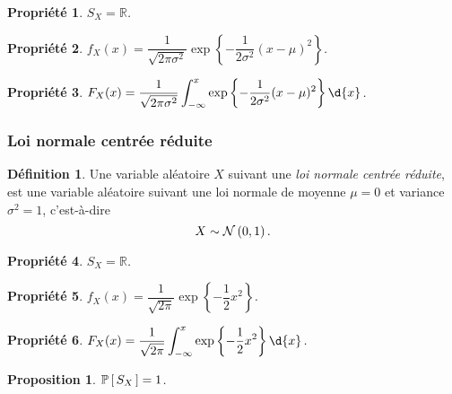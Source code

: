 \documentclass[11pt]{article}
\makeatletter
\renewcommand\P[1]{%
	\ensuremath{%
		\mathbb{P}\left[\,#1\,\right]%
	}%
}%
\newcommand\Norm[2]{%
	\ensuremath{%
		\mathcal{N}\left(#1,#2\right)%
	}%
}%
\newtheorem*{proposition}{Proposition}
\newtheorem{property}{Propriété}
\theoremstyle{remark}
\theoremstyle{definition}
\newtheorem*{@definition}{Définition}
\newenvironment{definition}{%
	\begin{@definition}%
}{%
	\end{@definition}%
	\setcounter{property}{0}%
}
\makeatother
\begin{document}
\begin{property}
	$S_X=\mathbb{R}$.
\end{property}

\begin{property}
	$f_X(x)=\dfrac{1}{\sqrt{2\pi\sigma^2}}\exp\left\{
		-\dfrac{1}{2\sigma^2}(x-\mu)^2
	\right\}$.
\end{property}

\begin{property}
	$F_X(x)=\dfrac{1}{\sqrt{2\pi\sigma^2}}\displaystyle\int_{-\infty}^x
		\exp\left\{-\dfrac{1}{2\sigma^2}(x-\mu)^2\right\}\d{x}$.
\end{property}


\subsubsection{Loi normale centrée réduite}
\begin{definition}
	Une variable aléatoire $X$ suivant une \textit{loi normale centrée
	réduite}, est une variable aléatoire suivant une loi normale de moyenne
	$\mu=0$ et variance $\sigma^2=1$, c'est-à-dire
	\begin{equation*}
		X\sim\Norm{0}{1}.
	\end{equation*}
\end{definition}

\begin{property}
	$S_X=\mathbb{R}$.
\end{property}

\begin{property}
	$f_X(x)=\dfrac{1}{\sqrt{2\pi}}\exp\left\{-\dfrac{1}{2}x^2\right\}$.
\end{property}

\begin{property}
	$F_X(x)=\dfrac{1}{\sqrt{2\pi}}\displaystyle\int_{-\infty}^x
		\exp\left\{-\frac{1}{2}x^2\right\}\d{x}$.
\end{property}

\begin{proposition}
	$\P{S_X}=1$.
\end{proposition}
\end{document}
